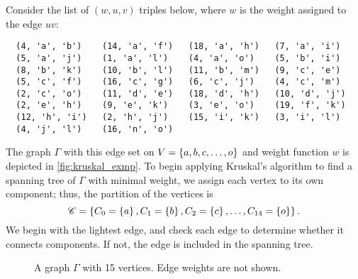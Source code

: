 \documentclass[m3380-lec-main.tex]{subfiles}
\begin{document}
\begin{exmp} Consider the list of $(w, u, v)$ triples below, where $w$ is the weight assigned to the edge $uv$:

\bc
\begin{verbatim}
  (4, 'a', 'b')    (14, 'a', 'f')   (18, 'a', 'h')   (7, 'a', 'i')
  (5, 'a', 'j')    (1, 'a', 'l')    (4, 'a', 'o')    (5, 'b', 'i')
  (8, 'b', 'k')    (10, 'b', 'l')   (11, 'b', 'm')   (9, 'c', 'e')
  (5, 'c', 'f')    (16, 'c', 'g')   (6, 'c', 'j')    (4, 'c', 'm')
  (2, 'c', 'o')    (11, 'd', 'e')   (18, 'd', 'h')   (10, 'd', 'j')
  (2, 'e', 'h')    (9, 'e', 'k')    (3, 'e', 'o')    (19, 'f', 'k')
  (12, 'h', 'i')   (2, 'h', 'j')    (15, 'i', 'k')   (3, 'i', 'l')
  (4, 'j', 'l')    (16, 'n', 'o')
\end{verbatim}
\ec
The graph $\Gamma$ with this edge set on $V=\left\{a,b,c,\ldots,o\right\}$ and weight function $w$ is depicted in \autoref{fig:kruskal_exmp}. To begin applying Kruskal's algorithm to find a spanning tree of $\Gamma$ with minimal weight, we assign each vertex to its own component; thus, the partition of the vertices is \[\mathscr{C} = \left\{C_0=\left\{a\right\},C_1=\left\{b\right\},C_2=\left\{c\right\},\ldots,C_{14}=\left\{o\right\}\right\}.\] We begin with the lightest edge, and check each edge to determine whether it connects components. If not, the edge is included in the spanning tree.

\begin{figure}[hbt]{\tiny
\begin{center}
\end{center}}
\caption{\label{fig:kruskal_exmp} A graph $\Gamma$ with 15 vertices. Edge weights are not shown.}
\end{figure}


\end{exmp}
\end{document}
